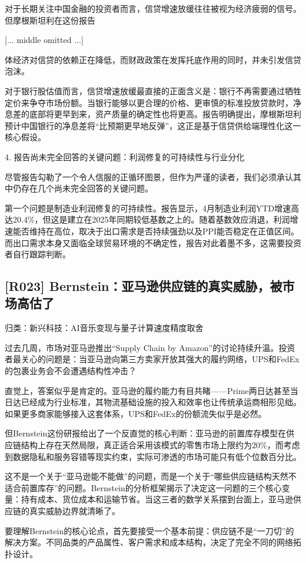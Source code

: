 \documentclass[11pt]{ctexart}
\begin{document}
对于长期关注中国金融的投资者而言，信贷增速放缓往往被视为经济疲弱的信号。但摩根斯坦利在这份报告

[... middle omitted ...]

体经济对信贷的依赖正在降低，而财政政策在发挥托底作用的同时，并未引发信贷泡沫。

对于银行股估值而言，信贷增速放缓最直接的正面含义是：银行不再需要通过牺牲定价来争夺市场份额。当银行能够以更合理的价格、更审慎的标准投放贷款时，净息差的底部将更早到来，资产质量的确定性也将更高。报告明确提出，摩根斯坦利预计中国银行的净息差将“比预期更早地反弹”，这正是基于信贷供给端理性化这一核心假设。

4. 报告尚未完全回答的关键问题：利润修复的可持续性与行业分化

尽管报告勾勒了一个令人信服的正循环图景，但作为严谨的读者，我们必须承认其中仍存在几个尚未完全回答的关键问题。

第一个问题是制造业利润修复的可持续性。报告显示，4月制造业利润YTD增速高达20.4\%，但这是建立在2025年同期较低基数之上的。随着基数效应消退，利润增速能否维持在高位，取决于出口需求是否持续强劲以及PPI能否稳定在正值区间。而出口需求本身又面临全球贸易环境的不确定性，报告对此着墨不多，这需要投资者自行跟踪判断。

\subsection{[R023] Bernstein：亚马逊供应链的真实威胁，被市场高估了}
{\small\color{refgray}归类：新兴科技：AI音乐变现与量子计算速度精度取舍}

过去几周，市场对亚马逊推出“Supply Chain by Amazon”的讨论持续升温。投资者最关心的问题是：当亚马逊向第三方卖家开放其强大的履约网络，UPS和FedEx的包裹业务会不会遭遇结构性冲击？

直觉上，答案似乎是肯定的。亚马逊的履约能力有目共睹——Prime两日达甚至当日达已经成为行业标准，其物流基础设施的投入和效率也让传统承运商相形见绌。如果更多商家能够接入这套体系，UPS和FedEx的份额流失似乎是必然。

但Bernstein这份研报给出了一个反直觉的核心判断：亚马逊的前置库存模型在供应链结构上存在天然局限，真正适合采用该模式的零售市场上限约为20\%，而考虑到数据隐私和服务容错等现实约束，实际可渗透的市场可能只有低个位数百分比。

这不是一个关于“亚马逊能不能做”的问题，而是一个关于“哪些供应链结构天然不适合前置库存”的问题。Bernstein的分析框架揭示了决定这一问题的三个核心变量：持有成本、货位成本和运输节省。当这三者的数学关系摆到台面上，亚马逊供应链的真实威胁边界就清晰了。

要理解Bernstein的核心论点，首先要接受一个基本前提：供应链不是“一刀切”的解决方案。不同品类的产品属性、客户需求和成本结构，决定了完全不同的网络拓扑设计。
\end{document}
